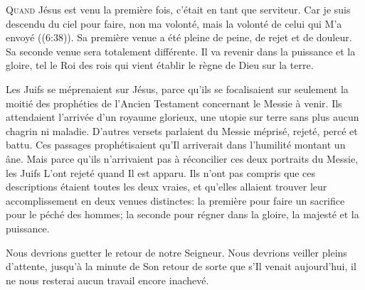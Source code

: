 \dvrule







\lettrine{Q}{uand} Jésus est venu la première fois,
 c'était en tant que serviteur.
 \Og Car je suis descendu du ciel pour faire, non ma volonté,
 mais la volonté de celui qui M'a envoyé \Fg{} ((6:38)).
 Sa première venue a été pleine de peine, de rejet et de douleur.
 Sa seconde venue sera totalement différente.
 Il va revenir dans la puissance et la gloire, tel
 \Og le  Roi des rois \Fg{} 
 qui vient établir le règne de Dieu sur la terre.

Les Juifs se méprenaient sur Jésus,
 parce qu'ils se focalisaient sur seulement la moitié des prophéties
 de l'Ancien Testament concernant le Messie à venir.
 Ils attendaient l'arrivée d'un royaume glorieux, 
 une utopie sur terre sans plus aucun chagrin ni maladie.
 D'autres versets parlaient du Messie méprisé, rejeté, percé et battu.
 Ces passages prophétisaient qu'Il arriverait dans l'humilité montant un âne.
 Mais parce qu'ils n'arrivaient pas à réconcilier ces deux portraits
 du Messie, les Juifs L'ont rejeté quand Il est apparu.
 Ils n'ont pas compris que ces descriptions étaient toutes les deux vraies,
 et qu'elles allaient trouver leur accomplissement en deux venues distinctes:
 la première pour faire un sacrifice pour le péché des hommes;
 la seconde pour régner dans la gloire, la majesté et la puissance.


Nous devrions guetter le retour de notre Seigneur.
 Nous devrions veiller pleins d'attente, jusqu'à la minute de Son retour
 \ocadr de sorte que s'Il venait aujourd'hui, 
 il ne nous resterai aucun travail encore inachevé.

